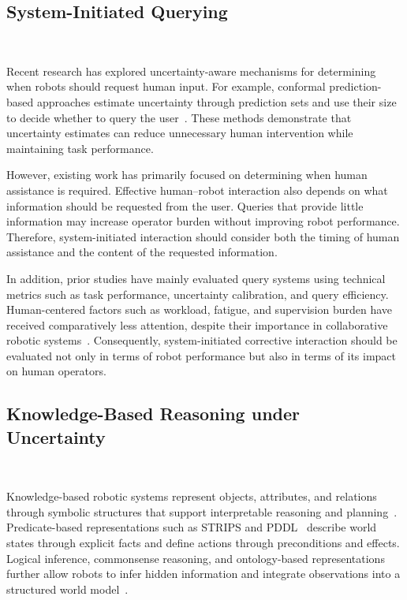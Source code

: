 \subsection{System-Initiated Querying}~\label{rel:query}

Recent research has explored uncertainty-aware mechanisms for determining when robots should request human input. For example, conformal prediction-based approaches estimate uncertainty through prediction sets and use their size to decide whether to query the user~\cite{knowno2023,liang2024introspective,mullen2025lbap}. These methods demonstrate that uncertainty estimates can reduce unnecessary human intervention while maintaining task performance.

However, existing work has primarily focused on determining when human assistance is required. Effective human--robot interaction also depends on what information should be requested from the user. Queries that provide little information may increase operator burden without improving robot performance. Therefore, system-initiated interaction should consider both the timing of human assistance and the content of the requested information.

In addition, prior studies have mainly evaluated query systems using technical metrics such as task performance, uncertainty calibration, and query efficiency. Human-centered factors such as workload, fatigue, and supervision burden have received comparatively less attention, despite their importance in collaborative robotic systems~\cite{murata2000ergonomics,borragan2017cognitive,rajavenkatanarayanan2019towards}. Consequently, system-initiated corrective interaction should be evaluated not only in terms of robot performance but also in terms of its impact on human operators.

\subsection{Knowledge-Based Reasoning under Uncertainty}~\label{rel:kb}

Knowledge-based robotic systems represent objects, attributes, and relations through symbolic structures that support interpretable reasoning and planning~\cite{brachman2004knowledge,russell1995modern}. Predicate-based representations such as STRIPS and PDDL~\cite{fikes1971strips,aeronautiques1998pddl} describe world states through explicit facts and define actions through preconditions and effects. Logical inference, commonsense reasoning, and ontology-based representations further allow robots to infer hidden information and integrate observations into a structured world model~\cite{tenorth2012knowledge,liu2020graph,kunze2014using,hasegawa2023inferring,mota2021integrated,zhang2024icorpp,daruna2019robocse}.


